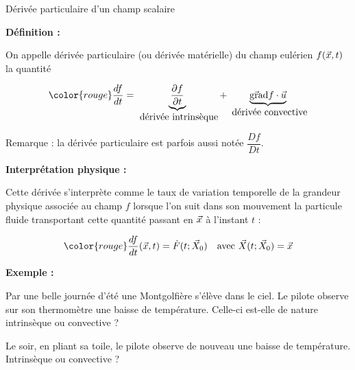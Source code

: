 \begin{frame}{Dérivée particulaire d'un champ scalaire}

\small

\textbf{Définition :} \medskip

On appelle \textcolor{vert}{dérivée particulaire} (ou dérivée matérielle) 
du champ eulérien $f(\vec{x}, t)$ la quantité

\[
	\color{rouge}
	\ddt{f} 
	=
	\underbrace{\dpdt{f}}_{\mbox{ dérivée intrinsèque}} +  \underbrace{\gradient f \cdot \myvec{u}}
	_{\mbox{ dérivée convective}}

\]

\medskip

Remarque : la dérivée particulaire est parfois aussi notée $\dfrac{Df}{Dt}$.

\bigskip
\pause

\textbf{Interprétation physique :} \medskip

Cette dérivée s'interprète comme le taux de variation temporelle de la grandeur physique associée au champ $f$ lorsque l'on suit dans son mouvement la particule fluide transportant cette quantité 
passant en $\vec{x}$ à l'instant $t$ :

\[
	{\color{rouge}
	\ddt{f}(\myvec{x},t) = \dot{F}(t; \myvec{X}_0)}
	\quad \mbox{avec $\myvec{X}(t; \myvec{X}_0) = \myvec{x}$} 
\]

\pause

\textbf{Exemple  :} 

\medskip
{\tiny 
Par une belle journée d'été une Montgolfière s'élève dans le ciel. Le pilote observe sur son thermomètre une baisse de température. Celle-ci est-elle de nature intrinsèque ou convective ?

\smallskip

Le soir, en pliant sa toile, le pilote observe de nouveau une baisse de température.  Intrinsèque ou convective ?
}


\vspace{20mm}

\end{frame}
